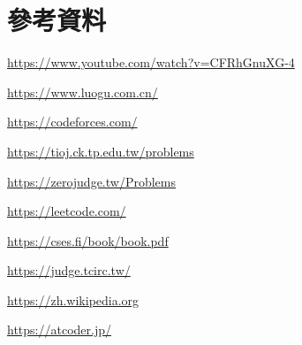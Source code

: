 \chapter*{參考資料}

\url{https://www.youtube.com/watch?v=CFRhGnuXG-4}

\url{https://www.luogu.com.cn/}

\url{https://codeforces.com/}

\url{https://tioj.ck.tp.edu.tw/problems}

\url{https://zerojudge.tw/Problems}

\url{https://leetcode.com/}

\url{https://cses.fi/book/book.pdf}

\url{https://judge.tcirc.tw/}

\url{https://zh.wikipedia.org}

\url{https://atcoder.jp/}